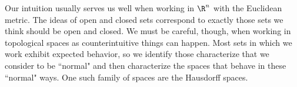 \label{sec:Hausdorff_topology}


\vspace*{-17 pt}
\framebox{\hspace*{3 pt}
\parbox{4.7 in}{\begin{fqs}
\item 

\end{fqs}} \hspace*{3 pt}}

\vspace*{13 pt}


Our intuition usually serves us well when working in $\R^n$ with the Euclidean metric. The ideas of open and closed sets correspond to exactly those sets we think should be open and closed. We must be careful, though, when working in topological spaces as counterintuitive things can happen. Most sets in which we work exhibit expected behavior, so we identify those characterize that we consider to be ``normal" and then characterize the spaces that behave in these ``normal" ways. One such family of spaces are the Hausdorff spaces.

